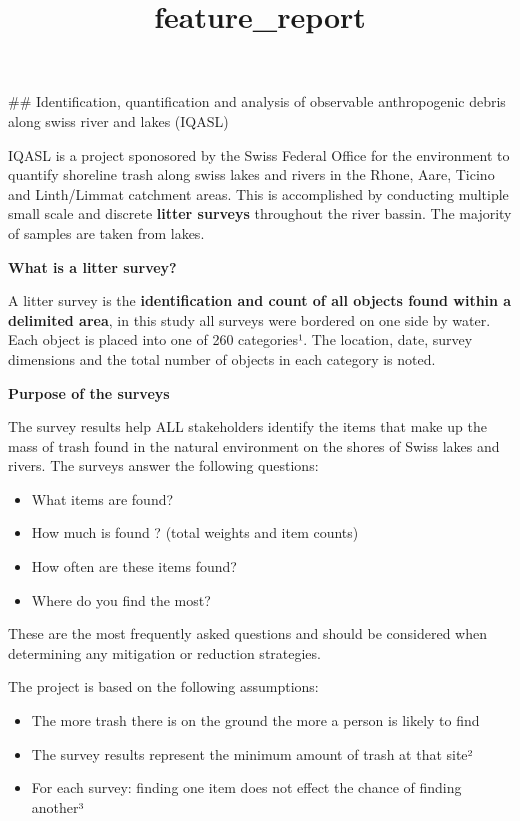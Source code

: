\documentclass[11pt]{article}
\title{feature\_report}
\providecommand{\tightlist}{%
      \setlength{\itemsep}{0pt}\setlength{\parskip}{0pt}}
\begin{document}
    
    \maketitle
    
    

    
    \#\# Identification, quantification and analysis of observable
anthropogenic debris along swiss river and lakes (IQASL)

    IQASL is a project sponosored by the Swiss Federal Office for the
environment to quantify shoreline trash along swiss lakes and rivers in
the Rhone, Aare, Ticino and Linth/Limmat catchment areas. This is
accomplished by conducting multiple small scale and discrete
\textbf{litter surveys} throughout the river bassin. The majority of
samples are taken from lakes.

\textbf{What is a litter survey?}

A litter survey is the \textbf{identification and count of all objects
found within a delimited area}, in this study all surveys were bordered
on one side by water. Each object is placed into one of 260 categories¹.
The location, date, survey dimensions and the total number of objects in
each category is noted.

\textbf{Purpose of the surveys}

The survey results help ALL stakeholders identify the items that make up
the mass of trash found in the natural environment on the shores of
Swiss lakes and rivers. The surveys answer the following questions:

\begin{itemize}
\tightlist
\item
  What items are found?
\item
  How much is found ? (total weights and item counts)
\item
  How often are these items found?
\item
  Where do you find the most?
\end{itemize}

These are the most frequently asked questions and should be considered
when determining any mitigation or reduction strategies.

The project is based on the following assumptions:

\begin{itemize}
\tightlist
\item
  The more trash there is on the ground the more a person is likely to
  find
\item
  The survey results represent the minimum amount of trash at that site²
\item
  For each survey: finding one item does not effect the chance of
  finding another³
\end{itemize}
\end{document}

